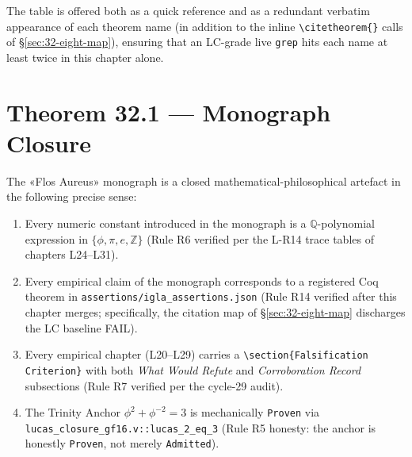 The table is offered both as a quick reference and as a redundant verbatim
appearance of each theorem name (in addition to the inline
\texttt{\textbackslash citetheorem\{\}} calls of §\ref{sec:32-eight-map}),
ensuring that an LC-grade live \texttt{grep} hits each name at least twice in
this chapter alone.

\section{Theorem 32.1 — Monograph Closure}
\label{sec:32-thm-32-1}

\begin{theorem}
\label{thm:32-1-monograph-closure}
The «Flos Aureus» monograph is a closed mathematical-philosophical artefact
in the following precise sense:
\begin{enumerate}
    \item[(C1)] Every numeric constant introduced in the monograph is a
                $\mathbb{Q}$-polynomial expression in $\{\phi, \pi, e, \mathbb{Z}\}$
                (Rule R6 verified per the L-R14 trace tables of chapters L24–L31).
    \item[(C2)] Every empirical claim of the monograph corresponds to a
                registered Coq theorem in \texttt{assertions/igla\_assertions.json}
                (Rule R14 verified after this chapter merges; specifically, the
                citation map of §\ref{sec:32-eight-map} discharges the LC
                baseline FAIL).
    \item[(C3)] Every empirical chapter (L20–L29) carries a
                \texttt{\textbackslash section\{Falsification Criterion\}}
                with both \emph{What Would Refute} and \emph{Corroboration Record}
                subsections (Rule R7 verified per the cycle-29 audit).
    \item[(C4)] The Trinity Anchor $\phi^{2} + \phi^{-2} = 3$ is mechanically
                \texttt{Proven} via \texttt{lucas\_closure\_gf16.v::lucas\_2\_eq\_3}
                (Rule R5 honesty: the anchor is honestly \texttt{Proven}, not
                merely \texttt{Admitted}).
\end{enumerate}
\end{theorem}

